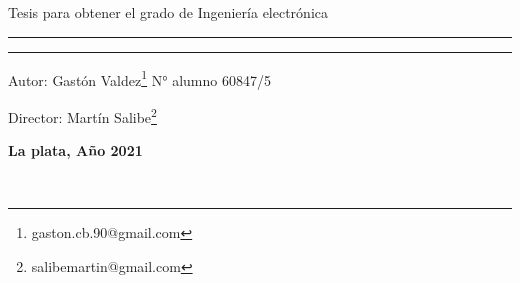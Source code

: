 \begin{titlepage}
{	
\vspace{-5mm}
\begin{center}
 \large{Tesis para obtener el grado de Ingeniería electrónica}
\end{center}
}
\vspace{-5mm}
\rule{\linewidth}{1mm}
{
\vspace{-2mm}
\begin{center}
	\textbf{\fontsize{20}{0}{\selectfont{Posicionador de antena para bajada de datos satelitales}}}
\end{center}
}
\rule{1\linewidth}{1mm} 	

 {\LARGE Autor: Gastón Valdez\footnote{gaston.cb.90@gmail.com} \hspace{50mm}  N° alumno 60847/5 \par} 
 {\LARGE Director: Martín Salibe\footnote{salibemartin@gmail.com}\par} 
 

\vfill
{
 \begin{center}
 	\LARGE\textbf{La plata, Año 2021}
 \end{center} 
}
\end{titlepage}
\newpage
$\ $
\thispagestyle{empty} %